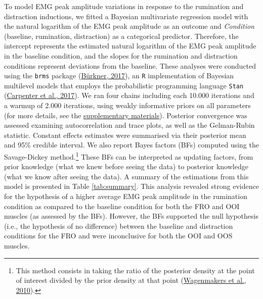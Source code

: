 \documentclass[
  english,
  man, donotrepeattitle,floatsintext]{apa6}
\begin{document}
To model EMG peak amplitude variations in response to the rumination and distraction inductions, we fitted a Bayesian multivariate regression model with the natural logarithm of the EMG peak amplitude as an outcome and \emph{Condition} (baseline, rumination, distraction) as a categorical predictor. Therefore, the intercept represents the estimated natural logarithm of the EMG peak amplitude in the baseline condition, and the slopes for the rumination and distraction conditions represent deviations from the baseline. These analyses were conducted using the \texttt{brms} package (\protect\hyperlink{ref-R-brms}{Bürkner, 2017}), an \texttt{R} implementation of Bayesian multilevel models that employs the probabilistic programming language \texttt{Stan} (\protect\hyperlink{ref-carpenter_stan_2017}{Carpenter et al., 2017}). We ran four chains including each 10.000 iterations and a warmup of 2.000 iterations, using weakly informative priors on all parameters (for more details, see the \protect\hyperlink{supp}{supplementary materials}). Posterior convergence was assessed examining autocorrelation and trace plots, as well as the Gelman-Rubin statistic. Constant effects estimates were summarised via their posterior mean and 95\% credible interval. We also report Bayes factors (BFs) computed using the Savage-Dickey method.\footnote{This method consists in taking the ratio of the posterior density at the point of interest divided by the prior density at that point (\protect\hyperlink{ref-wagenmakers_bayesian_2010}{Wagenmakers et al., 2010}).} These BFs can be interpreted as updating factors, from prior knowledge (what we knew before seeing the data) to posterior knowledge (what we know after seeing the data). A summary of the estimations from this model is presented in Table \ref{tab:summary}. This analysis revealed strong evidence for the hypothesis of a higher average EMG peak amplitude in the rumination condition as compared to the baseline condition for both the FRO and OOI muscles (as assessed by the BFs). However, the BFs supported the null hypothesis (i.e., the hypothesis of no difference) between the baseline and distraction conditions for the FRO and were inconclusive for both the OOI and OOS muscles.
\end{document}

